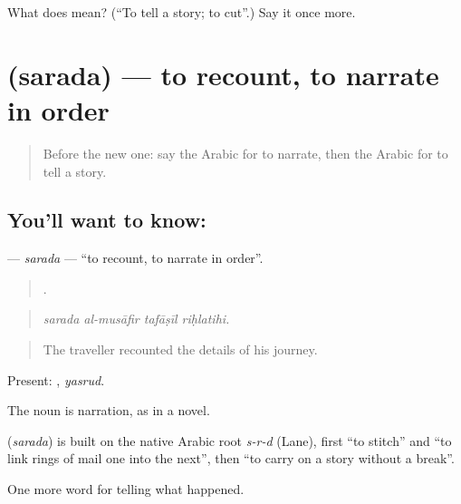 \begin{tcolorbox}[breakable,colback=teal!4,colframe=teal!35!black,title={Before you move on}]
What does  mean? (\textquotedblleft{}To tell a story; to cut\textquotedblright{}.) Say it once more.
\end{tcolorbox}
\section[\texorpdfstring{\ar{سرد} (sarada)}{سرد (sarada)}]{ (sarada) — to recount, to narrate in order}

\label{lesson:AR-C295-sarada}



\begin{quote}
Before the new one: say the Arabic for to narrate, then the Arabic for to tell a story.
\end{quote}

\subsection*{You'll want to know: }
\textbf{} — \emph{sarada} — \textquotedblleft{}to recount, to narrate in order\textquotedblright{}.

\begin{quote}
   .
\end{quote}

\begin{quote}
\emph{sarada al-musāfir tafāṣīl riḥlatihi.}
\end{quote}

\begin{quote}
The traveller recounted the details of his journey.
\end{quote}

Present: , \emph{yasrud}.

The noun  is narration, as in a novel.

\begin{cousinweb}
\textbf{} (\emph{sarada}) is built on the native Arabic root \emph{s-r-d} (Lane), first \textquotedblleft{}to stitch\textquotedblright{} and \textquotedblleft{}to link rings of mail one into the next\textquotedblright{}, then \textquotedblleft{}to carry on a story without a break\textquotedblright{}.
\end{cousinweb}

\begin{grammarlens}[title={What you've built}]
One more word for telling what happened.
\end{grammarlens}

